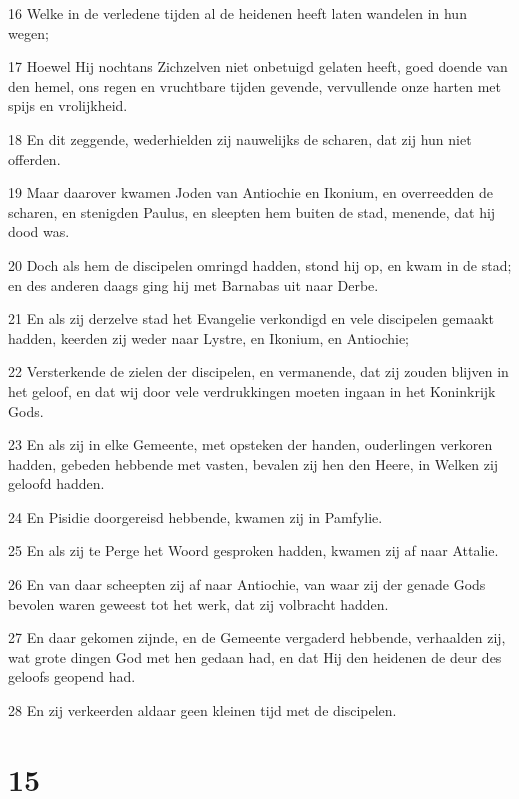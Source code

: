 \par 16 Welke in de verledene tijden al de heidenen heeft laten wandelen in hun wegen;
\par 17 Hoewel Hij nochtans Zichzelven niet onbetuigd gelaten heeft, goed doende van den hemel, ons regen en vruchtbare tijden gevende, vervullende onze harten met spijs en vrolijkheid.
\par 18 En dit zeggende, wederhielden zij nauwelijks de scharen, dat zij hun niet offerden.
\par 19 Maar daarover kwamen Joden van Antiochie en Ikonium, en overreedden de scharen, en stenigden Paulus, en sleepten hem buiten de stad, menende, dat hij dood was.
\par 20 Doch als hem de discipelen omringd hadden, stond hij op, en kwam in de stad; en des anderen daags ging hij met Barnabas uit naar Derbe.
\par 21 En als zij derzelve stad het Evangelie verkondigd en vele discipelen gemaakt hadden, keerden zij weder naar Lystre, en Ikonium, en Antiochie;
\par 22 Versterkende de zielen der discipelen, en vermanende, dat zij zouden blijven in het geloof, en dat wij door vele verdrukkingen moeten ingaan in het Koninkrijk Gods.
\par 23 En als zij in elke Gemeente, met opsteken der handen, ouderlingen verkoren hadden, gebeden hebbende met vasten, bevalen zij hen den Heere, in Welken zij geloofd hadden.
\par 24 En Pisidie doorgereisd hebbende, kwamen zij in Pamfylie.
\par 25 En als zij te Perge het Woord gesproken hadden, kwamen zij af naar Attalie.
\par 26 En van daar scheepten zij af naar Antiochie, van waar zij der genade Gods bevolen waren geweest tot het werk, dat zij volbracht hadden.
\par 27 En daar gekomen zijnde, en de Gemeente vergaderd hebbende, verhaalden zij, wat grote dingen God met hen gedaan had, en dat Hij den heidenen de deur des geloofs geopend had.
\par 28 En zij verkeerden aldaar geen kleinen tijd met de discipelen.

\chapter{15}

